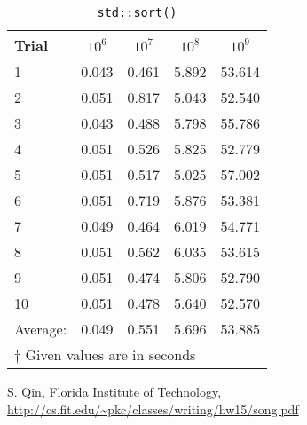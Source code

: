 \documentclass[addpoints]{exam}
\begin{document}
\begin{questions}
\begin{solution}
\begin{table}[H]
\centering
\caption{{\tt std::sort()}}
\begin{tabular}{l | c c c c }
\hline\hline
Trial & $10^{6}$ & $10^{7}$ & $10^{8}$ & $10^{9}$\\
\hline
1 & 0.043 & 0.461 & 5.892 & 53.614\\
2 & 0.051 & 0.817 & 5.043 & 52.540\\
3 & 0.043 & 0.488 & 5.798 & 55.786\\
4 & 0.051 & 0.526 & 5.825 & 52.779\\
5 & 0.051 & 0.517 & 5.025 & 57.002\\
6 & 0.051 & 0.719 & 5.876 & 53.381\\
7 & 0.049 & 0.464 & 6.019 & 54.771\\
8 & 0.051 & 0.562 & 6.035 & 53.615\\
9 & 0.051 & 0.474 & 5.806 & 52.790\\
10 & 0.051 & 0.478 & 5.640 & 52.570\\
\hline
Average: & 0.049 & 0.551 & 5.696 & 53.885\\
\hline\hline
\multicolumn{5}{l}{{\scriptsize $\dagger$ Given values are in seconds}}
\end{tabular}
\label{table:sort}
\end{table}

\end{solution}
\end{questions}

\begin{thebibliography}{99}
S. Qin, Florida Institute of Technology, \url{http://cs.fit.edu/~pkc/classes/writing/hw15/song.pdf}
\end{thebibliography}
\end{document}
